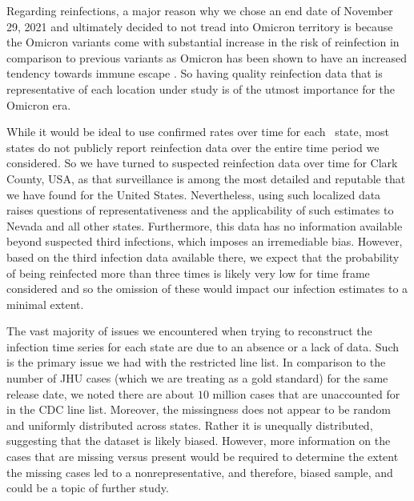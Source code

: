 \documentclass{article}
\begin{document}
Regarding reinfections, a major reason why we chose an end date of November 29, 2021 and ultimately decided to not tread into Omicron territory is because the Omicron variants come with substantial increase in the risk of reinfection in comparison to previous variants as Omicron has been shown to have an increased tendency towards immune escape \citep{wei2024risk, pulliam2022increased, eythorsson2022rate}. So having quality reinfection data that is representative of each location under study is of the utmost importance for the Omicron era. 

While it would be ideal to use confirmed rates over time for each \US\ state, most states do not publicly report reinfection 
data over the entire time period we considered. So we have turned to 
suspected reinfection data over time for Clark County, USA, as that surveillance
is among the most detailed and reputable that we have found for the United States.
Nevertheless, using such localized data raises questions of representativeness
and the applicability of such estimates to Nevada and all other states.
Furthermore, this data has no information available beyond suspected third
infections, which imposes an irremediable bias. However, based on the third
infection data available there, we expect that the probability of being
reinfected more than three times is likely very low for time frame considered
and so the omission of these would impact our infection estimates to a minimal
extent. 

The vast majority of issues we encountered when trying to reconstruct the
infection time series for each state are due to an absence or a lack of data.
Such is the primary issue we had with the restricted line list. In comparison to
the number of JHU cases (which we are treating as a gold standard) for the same
release date, we noted there are about $10$ million cases that are unaccounted
for in the CDC line list. Moreover, the missingness does not appear to be random
and uniformly distributed across states. Rather it is unequally distributed,
suggesting that the dataset is likely biased. However, more information on the
cases that are missing versus present would be required to determine the extent
the missing cases led to a nonrepresentative, and therefore, biased sample, and
could be a topic of further study.
\end{document}
